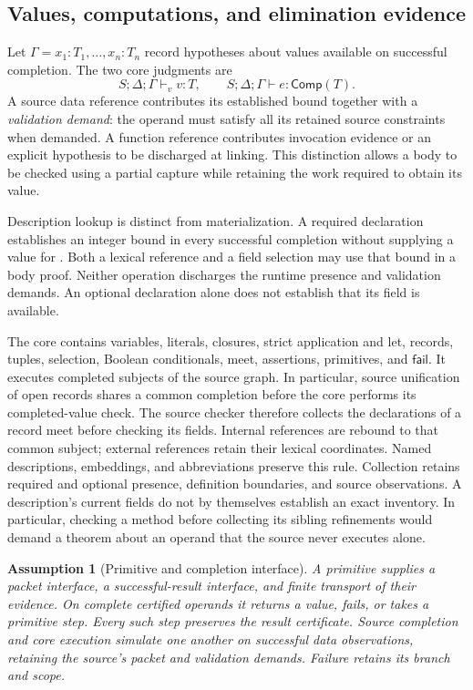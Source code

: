 \documentclass[10pt,a4paper]{article}
\newcommand{\code}[1]{\texttt{\detokenize{#1}}}
\newcommand{\Comp}{\mathsf{Comp}}
\newcommand{\Fail}{\mathsf{fail}}
\newcommand{\jud}{S;\Delta;\Gamma}
\newtheorem{assumption}[definition]{Assumption}
\theoremstyle{remark}
\begin{document}
\subsection{Values, computations, and elimination evidence}
Let $\Gamma=x_1:T_1,\ldots,x_n:T_n$ record hypotheses about values available
on successful completion. The two core judgments are
\[
 \jud\vdash_v v:T,
 \qquad
 \jud\vdash e:\Comp(T).
\]
A source data reference contributes its established bound together with a
\emph{validation demand}: the operand must satisfy all its retained source
constraints when demanded. A function reference contributes invocation evidence
or an explicit hypothesis to be discharged at linking. This distinction allows
a body to be checked using a partial capture while retaining the work required
to obtain its value.

Description lookup is distinct from materialization. A required declaration
\code{z!: int} establishes an integer bound in every successful completion
without supplying a value for \code{z}. Both a lexical reference and a field
selection may use that bound in a body proof. Neither operation discharges the
runtime presence and validation demands. An optional declaration alone does
not establish that its field is available.

The core contains variables, literals, closures, strict application and let,
records, tuples, selection, Boolean conditionals, meet, assertions, primitives,
and $\Fail$. It executes completed subjects of the source graph. In particular,
source unification of open records shares a common completion before the core
performs its completed-value check.
The source checker therefore collects the declarations of a record meet before
checking its fields. Internal references are rebound to that common subject;
external references retain their lexical coordinates. Named descriptions,
embeddings, and abbreviations preserve this rule. Collection retains required
and optional presence, definition boundaries, and source observations. A
description's current fields do not by themselves establish an exact inventory.
In particular, checking a method before collecting its sibling refinements
would demand a theorem about an operand that the source never executes alone.

\begin{assumption}[Primitive and completion interface]\label{ass:operations}
A primitive supplies a packet interface, a successful-result interface, and
finite transport of their evidence. On complete certified operands it returns a
value, fails, or takes a primitive step. Every such step preserves the result
certificate. Source completion and core execution simulate one another on
successful data observations, retaining the source's packet and validation
demands. Failure retains its branch and scope.
\end{assumption}
\end{document}

